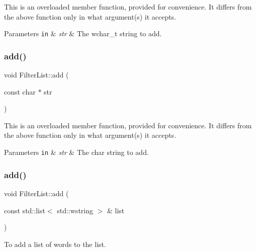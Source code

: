 This is an overloaded member function, provided for convenience. It differs from the above function only in what argument(s) it accepts. 
\begin{DoxyParams}[1]{Parameters}
\mbox{\tt in}  & {\em str} & The wchar\+\_\+t string to add. \\
\hline
\end{DoxyParams}
\mbox{\label{classlakoo_1_1_filter_list_a18832d0651232414540a844e603e8f82}} 
\subsubsection{\texorpdfstring{add()}{add()}\hspace{0.1cm}{\footnotesize\ttfamily [4/8]}}
{\footnotesize\ttfamily void Filter\+List\+::add (\begin{DoxyParamCaption}\item[{const char $\ast$}]{str }\end{DoxyParamCaption})}

This is an overloaded member function, provided for convenience. It differs from the above function only in what argument(s) it accepts. 
\begin{DoxyParams}[1]{Parameters}
\mbox{\tt in}  & {\em str} & The char string to add. \\
\hline
\end{DoxyParams}
\mbox{\label{classlakoo_1_1_filter_list_ac7e57e54deb4c41f5865734671ca5f12}} 
\subsubsection{\texorpdfstring{add()}{add()}\hspace{0.1cm}{\footnotesize\ttfamily [5/8]}}
{\footnotesize\ttfamily void Filter\+List\+::add (\begin{DoxyParamCaption}\item[{const std\+::list$<$ std\+::wstring $>$ \&}]{list }\end{DoxyParamCaption})}



To add a list of words to the list. 


